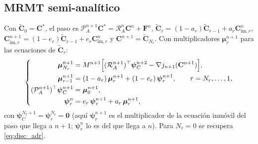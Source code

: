 \documentclass[11pt]{article}
\numberwithin{equation}{section}
\theoremstyle{plain}
\theoremstyle{definition}
\theoremstyle{remark}
\newcommand{\im}{\mathrm{im}}
\begin{document}
\subsection{MRMT semi-analítico}
Con $\tilde{\mathbf{C}}_0=\mathbf{C}^*$, el paso es
$\mathcal{P}_A^{n+1}\mathbf{C}^*=\mathcal{R}_A^{n}\mathbf{C}^n+\mathbf{F}^n$,
$\tilde{\mathbf{C}}_r=(1-a_r)\tilde{\mathbf{C}}_{r-1}+a_r\mathbf{C}^n_{\im,r}$,
$\mathbf{C}^{n+1}_{\im,r}=(1-e_r)\tilde{\mathbf{C}}_{r-1}+e_r\mathbf{C}^n_{\im,r}$ y
$\mathbf{C}^{n+1}=\tilde{\mathbf{C}}_{N_r}$. Con multiplicadores $\boldsymbol\mu_r^{n+1}$ para las ecuaciones de
$\tilde{\mathbf{C}}_r$:
\begin{equation}
\left\{\begin{aligned}
\boldsymbol\mu_{N_r}^{n+1}&=M^{n+1}\Bigl[(\mathcal{R}_A^{n+1})^\top\boldsymbol\psi_C^{n+2}-\nabla j_{n+1}(\mathbf{C}^{n+1})\Bigr],\\
\boldsymbol\mu_{r-1}^{n+1}&=(1-a_r)\,\boldsymbol\mu_r^{n+1}+(1-e_r)\,\boldsymbol\psi_r^{n+1},\qquad r=N_r,\dots,1,\\
(\mathcal{P}_A^{n+1})^\top\boldsymbol\psi_C^{n+1}&=\boldsymbol\mu_0^{n+1},\\
\boldsymbol\psi_r^{n}&=e_r\,\boldsymbol\psi_r^{n+1}+a_r\,\boldsymbol\mu_r^{n+1},
\end{aligned}\right.
\label{eq:disc_semi}
\end{equation}
con $\boldsymbol\psi_C^{N_t+1}=\boldsymbol\psi_r^{N_t}=\mathbf{0}$ (aquí $\boldsymbol\psi_r^{n+1}$ es el multiplicador de la ecuación inmóvil del paso que llega a $n+1$; $\boldsymbol\psi_r^{n}$ lo es del que llega a $n$). Para $N_r=0$ se recupera \eqref{eq:disc_adr}.
\end{document}
